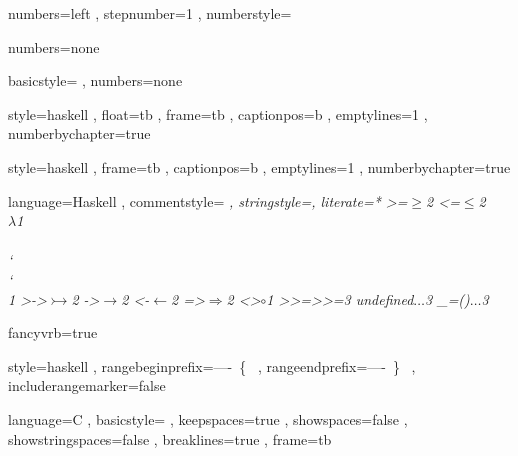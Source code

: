 \usepackage{xcolor}
\usepackage{fancyvrb}
\usepackage[scaled]{beramono}


    { numbers=left
    , stepnumber=1
    , numberstyle=\tiny
    }

    { numbers=none
    }

    {
    }

    { basicstyle=\color{red}\ttfamily
    , numbers=none
    }

    { style=haskell
    , float=tb
    , frame=tb
    , captionpos=b
    , emptylines=1
    , numberbychapter=true
    }

    { style=haskell
    , frame=tb
    , captionpos=b
    , emptylines=1
    , numberbychapter=true
    }

    { language=Haskell
    , commentstyle=\color[rgb]{0.38,0.63,0.69}\itshape
    , stringstyle=\textcolor[rgb]{0.25,0.44,0.63}
    , literate=*
        {>=}{{$\geq$}}2
        {<=}{{$\leq$}}2
        {\\}{{$\lambda$}}1
        {\\\\}{{\char`\\\char`\\}}1
        {>->}{{$\rightarrowtail$}}2
        {->}{{$\rightarrow$}}2
        {<-}{{$\leftarrow$}}2
        {=>}{{$\Rightarrow$}}2
        {<>}{{$\circ$}}1
        {>>=}{{>>=}}3
        {undefined}{{$\ldots$}}3
        {_=()}{{$\ldots$}}3
    }

    { fancyvrb=true
    }

    { style=haskell
    , rangebeginprefix=----\ \{\ %
    , rangeendprefix=----\ \}\ %
    , includerangemarker=false
    }

\lstset
    { language=C
    , basicstyle=\fontsize{8}{10}\ttfamily
    , keepspaces=true
    , showspaces=false
    , showstringspaces=false
    , breaklines=true
    , frame=tb
    }
\lstset{ style=numbers
       , captionpos=b
       }

